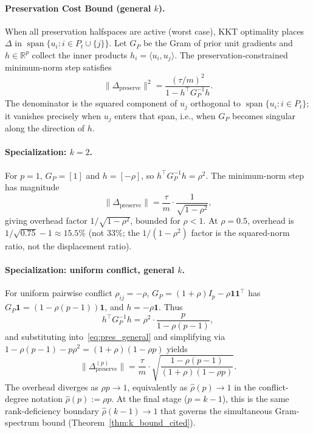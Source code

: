 \documentclass{article}
\theoremstyle{plain}
\theoremstyle{definition}
\theoremstyle{remark}
\newcommand{\rhohat}{\hat{\rho}}
\begin{document}
\paragraph{Preservation Cost Bound (general $k$).}
When all preservation halfspaces are active (worst case), KKT optimality places $\Delta$ in $\operatorname{span}\{u_i : i \in P_t \cup \{j\}\}$. Let $G_P$ be the Gram of prior unit gradients and $h \in \mathbb{R}^p$ collect the inner products $h_i = \langle u_i, u_j\rangle$. The preservation-constrained minimum-norm step satisfies
\begin{equation}
\label{eq:pres_general}
\|\Delta_{\text{preserve}}\|^2 = \frac{(\tau/m)^2}{1 - h^\top G_P^{-1} h}.
\end{equation}
The denominator is the squared component of $u_j$ orthogonal to $\operatorname{span}\{u_i : i \in P_t\}$; it vanishes precisely when $u_j$ enters that span, i.e., when $G_P$ becomes singular along the direction of $h$.

\paragraph{Specialization: $k=2$.}
For $p=1$, $G_P = [1]$ and $h = [-\rho]$, so $h^\top G_P^{-1} h = \rho^2$. The minimum-norm step has magnitude
\[
\|\Delta_{\text{preserve}}\| = \frac{\tau}{m} \cdot \frac{1}{\sqrt{1-\rho^2}},
\]
giving overhead factor $1/\sqrt{1-\rho^2}$, bounded for $\rho < 1$. At $\rho = 0.5$, overhead is $1/\sqrt{0.75} - 1 \approx 15.5\%$ (not $33\%$; the $1/(1-\rho^2)$ factor is the squared-norm ratio, not the displacement ratio).

\paragraph{Specialization: uniform conflict, general $k$.}
For uniform pairwise conflict $\rho_{ij} = -\rho$, $G_P = (1+\rho)I_p - \rho \mathbf{1}\mathbf{1}^\top$ has $G_P \mathbf{1} = (1-\rho(p-1))\mathbf{1}$, and $h = -\rho \mathbf{1}$. Thus
\[
h^\top G_P^{-1} h = \rho^2 \cdot \frac{p}{1-\rho(p-1)},
\]
and substituting into~\eqref{eq:pres_general} and simplifying via $1 - \rho(p-1) - p\rho^2 = (1+\rho)(1-\rho p)$ yields
\begin{equation}
\label{eq:pres_uniform}
\|\Delta_{\text{preserve}}^{(p)}\| = \frac{\tau}{m} \cdot \sqrt{\frac{1-\rho(p-1)}{(1+\rho)(1-\rho p)}}.
\end{equation}
The overhead diverges as $\rho p \to 1$, equivalently as $\rhohat(p) \to 1$ in the conflict-degree notation $\rhohat(p) := \rho p$. At the final stage ($p = k-1$), this is the same rank-deficiency boundary $\rhohat(k-1) \to 1$ that governs the simultaneous Gram-spectrum bound (Theorem~\ref{thm:k_bound_cited}).
\end{document}
